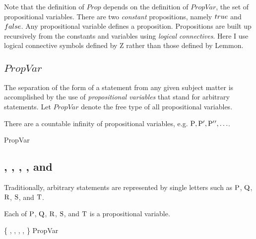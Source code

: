 \documentclass[11pt, oneside]{article}
\begin{document}
Note that the definition of $Prop$ depends on the definition of $PropVar$, the set of propositional variables.
There are two {\it constant} propositions, namely $true$ and $false$.
Any propositional variable defines a proposition.
Propositions are built up recursively from the constants and variables using {\it logical connectives}.
Here I use logical connective symbols defined by Z rather than those defined by Lemmon.

\subsection{$PropVar$}

The separation of the form of a statement from any given subject matter is accomplished by 
the use of {\it propositional variables} that stand for arbitrary statements.
Let $PropVar$ denote the free type of all propositional variables.

\begin{remark}
There are a countable infinity of propositional variables,
e.g. $\mathrm{P}, \mathrm{P}{'}, \mathrm{P}{'}{'}, \ldots$.

\begin{zed}
	PropVar \bij \nat \neq \emptyset
\end{zed}

\end{remark}

\subsection{, , , , and }

Traditionally, arbitrary statements are represented by single letters such as
$\mathrm{P}$, $\mathrm{Q}$, $\mathrm{R}$, $\mathrm{S}$, and $\mathrm{T}$.

\begin{remark}
Each of $\mathrm{P}$, $\mathrm{Q}$, $\mathrm{R}$, $\mathrm{S}$, and $\mathrm{T}$ is a propositional variable.

\begin{zed}
	\{ \propP, \propQ, \propR, \propS, \propT \} \subset PropVar
\end{zed}

\end{remark}

\subsection{}
\end{document}
